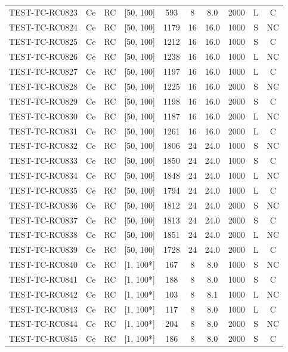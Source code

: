\begin{longtable}{lccccccccc}
TEST-TC-RC0823 & Ce & RC & [50, 100] & 593 & 8 & 8.0 & 2000 & L & C \\
TEST-TC-RC0824 & Ce & RC & [50, 100] & 1179 & 16 & 16.0 & 1000 & S & NC \\
TEST-TC-RC0825 & Ce & RC & [50, 100] & 1212 & 16 & 16.0 & 1000 & S & C \\
TEST-TC-RC0826 & Ce & RC & [50, 100] & 1238 & 16 & 16.0 & 1000 & L & NC \\
TEST-TC-RC0827 & Ce & RC & [50, 100] & 1197 & 16 & 16.0 & 1000 & L & C \\
TEST-TC-RC0828 & Ce & RC & [50, 100] & 1225 & 16 & 16.0 & 2000 & S & NC \\
TEST-TC-RC0829 & Ce & RC & [50, 100] & 1198 & 16 & 16.0 & 2000 & S & C \\
TEST-TC-RC0830 & Ce & RC & [50, 100] & 1187 & 16 & 16.0 & 2000 & L & NC \\
TEST-TC-RC0831 & Ce & RC & [50, 100] & 1261 & 16 & 16.0 & 2000 & L & C \\
TEST-TC-RC0832 & Ce & RC & [50, 100] & 1806 & 24 & 24.0 & 1000 & S & NC \\
TEST-TC-RC0833 & Ce & RC & [50, 100] & 1850 & 24 & 24.0 & 1000 & S & C \\
TEST-TC-RC0834 & Ce & RC & [50, 100] & 1848 & 24 & 24.0 & 1000 & L & NC \\
TEST-TC-RC0835 & Ce & RC & [50, 100] & 1794 & 24 & 24.0 & 1000 & L & C \\
TEST-TC-RC0836 & Ce & RC & [50, 100] & 1812 & 24 & 24.0 & 2000 & S & NC \\
TEST-TC-RC0837 & Ce & RC & [50, 100] & 1813 & 24 & 24.0 & 2000 & S & C \\
TEST-TC-RC0838 & Ce & RC & [50, 100] & 1851 & 24 & 24.0 & 2000 & L & NC \\
TEST-TC-RC0839 & Ce & RC & [50, 100] & 1728 & 24 & 24.0 & 2000 & L & C \\
TEST-TC-RC0840 & Ce & RC & [1, 100*] & 167 & 8 & 8.0 & 1000 & S & NC \\
TEST-TC-RC0841 & Ce & RC & [1, 100*] & 188 & 8 & 8.0 & 1000 & S & C \\
TEST-TC-RC0842 & Ce & RC & [1, 100*] & 103 & 8 & 8.1 & 1000 & L & NC \\
TEST-TC-RC0843 & Ce & RC & [1, 100*] & 117 & 8 & 8.0 & 1000 & L & C \\
TEST-TC-RC0844 & Ce & RC & [1, 100*] & 204 & 8 & 8.0 & 2000 & S & NC \\
TEST-TC-RC0845 & Ce & RC & [1, 100*] & 186 & 8 & 8.0 & 2000 & S & C \\

\end{longtable}
